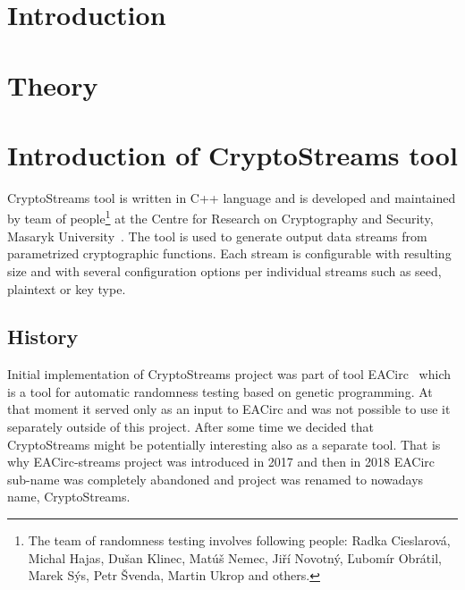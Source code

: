 \documentclass[
    digital,    %
    oneside,    %
    color,
    11pt,
    nocover,
    notable,
    nolof,
    nolot,
    final
]{fithesis3}
\begin{document}
\setlength{\parskip}{5pt}
\setlength{\parindent}{0pt}


\chapter{Introduction}
\label{chap:introduction}


\chapter{Theory}

\chapter{Introduction of CryptoStreams tool}
\label{chap:cryptostreams}

CryptoStreams tool is written in C++ language and is developed and maintained by team of people\footnote{The team of randomness testing involves following people: Radka Cieslarová, Michal Hajas, Dušan Klinec, Matúš Nemec, Jiří Novotný, Ľubomír Obrátil, Marek Sýs, Petr Švenda, Martin Ukrop and others.} at the Centre for Research on Cryptography and Security, Masaryk University~\cite{CryptoStreams}. The tool is used to generate output data streams from parametrized cryptographic functions. Each stream is configurable with resulting size and with several configuration options per individual streams such as seed, plaintext or key type. 

\section{History}

Initial implementation of CryptoStreams project was part of tool EACirc~\cite{EACirc} which is a tool for automatic randomness testing based on genetic programming. At that moment it served only as an input to EACirc and was not possible to use it separately outside of this project. After some time we decided that CryptoStreams might be potentially interesting also as a separate tool. That is why EACirc-streams project was introduced in 2017 and then in 2018 EACirc sub-name was completely abandoned and project was renamed to nowadays name, CryptoStreams.
\end{document}

